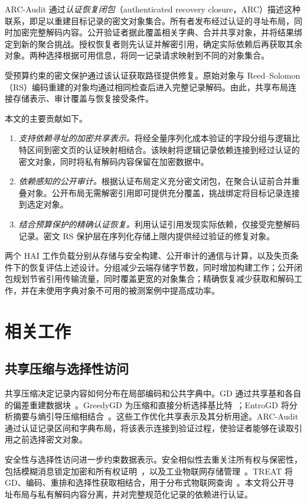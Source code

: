 \documentclass[10pt,journal]{IEEEtran}
\begin{document}
ARC-Audit 通过\emph{认证恢复闭包}（authenticated recovery closure，ARC）描述这种联系，即足以重建目标记录的密文对象集合。所有者发布经过认证的寻址布局，同时加密完整解码内容。公开验证者据此覆盖相关字典、合并共享对象，并将结果绑定到新的聚合挑战。授权恢复者则先认证并解密引用，确定实际依赖后再获取其余对象。两种选择根据可用信息，将同一记录请求映射到不同的对象集合。

受预算约束的密文保护通过该认证获取路径提供修复。原始对象与 Reed--Solomon（RS）编码重建的对象均通过相同检查后进入完整记录解码。由此，共享布局连接存储表示、审计覆盖与恢复接受条件。

本文的主要贡献如下。
\begin{enumerate}
\item \emph{支持依赖寻址的加密共享表示。}将经全量序列化成本验证的字段分组与逻辑比特区间到密文页的认证映射相结合。该映射将逻辑记录依赖连接到经过认证的密文对象，同时将私有解码内容保留在加密数据中。
\item \emph{依赖感知的公开审计。}根据认证布局定义充分密文闭包，在聚合认证前合并重叠对象。公开布局无需解密引用即可提供充分覆盖，挑战绑定将目标记录连接到选定对象。
\item \emph{结合预算保护的精确认证恢复。}利用认证引用发现实际依赖，仅接受完整解码记录。密文 RS 保护层在序列化存储上限内提供经过验证的修复对象。
\end{enumerate}

两个 HAI 工作负载分别从存储与安全构建、公开审计的通信与计算，以及失页条件下的恢复评估上述设计。分组减少云端存储字节数，同时增加构建工作；公开闭包规划节省引用传输流量，同时覆盖更宽的对象集合；精确恢复减少获取和解码工作，并在未使用字典对象不可用的被测案例中提高成功率。
\section{相关工作}
\subsection{共享压缩与选择性访问}
共享压缩决定记录内容如何分布在局部编码和公共字典中。GD 通过共享基和各自的偏差重建数据块~\cite{Talasila2019}。GreedyGD 为压缩和直接分析选择基比特~\cite{Hurst2024GreedyGD}；EntroGD 将分析摘要与熵引导压缩相结合~\cite{Zhao2026EntroGD}。这些工作优化共享表示及其分析用途。ARC-Audit 通过认证记录区间和字典布局，将该表示连接到验证过程，使验证者能够在读取引用之前选择密文对象。

安全性与选择性访问进一步约束数据表示。安全相似性去重关注所有权与保密性，包括模糊消息锁定加密和所有权证明~\cite{Jiang2023FuzzyDedup}，以及工业物联网存储管理~\cite{Gao2024}。TREAT 将 GD、编码、重排和选择性获取相结合，用于分布式物联网查询~\cite{Taurone2024TREAT}。本文将公开寻址布局与私有解码内容分离，并对完整规范化记录的依赖进行认证。
\end{document}
